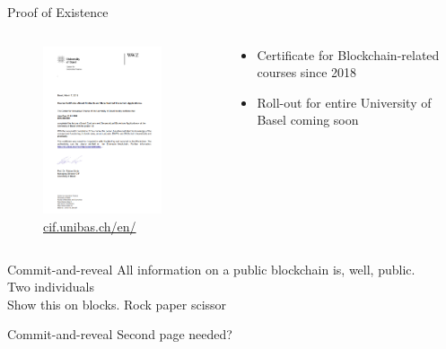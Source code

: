 \documentclass[]{beamer}
\begin{document}

\begin{frame}{Proof of Existence}
	\begin{columns}
		\begin{column}{0.5\textwidth}
			\begin{figure}
				\centering
				\includegraphics[width=3.5cm, frame]{../assets/images/Diploma_unibas.PNG}
				\scriptsize{\href{https://cif.unibas.ch/en/events-projects/certificates/}{cif.unibas.ch/en/}}
			\end{figure}
		\end{column}
		\begin{column}{0.5\textwidth}
			\begin{itemize}
				\item<2 -> Certificate for Blockchain-related courses since 2018 
				\item<3 -> Roll-out for entire University of Basel coming soon
			\end{itemize}
		\end{column}
	\end{columns}
\end{frame}


\begin{frame}{Commit-and-reveal}
	All information on a public blockchain is, well, public.\\
	Two individuals\\
	Show this on blocks. Rock paper scissor
\end{frame}


\begin{frame}{Commit-and-reveal}
 Second page needed?
\end{frame}

\end{document}
